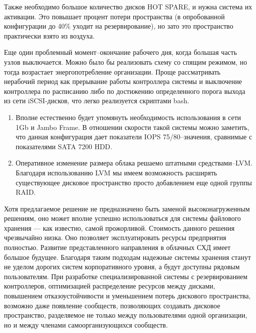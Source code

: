 \documentclass[10pt, a5paper]{article}
\begin{document}
Также необходимо большое количество дисков HOT SPARE, и нужна система их активации. Это повышает процент потери пространства (в опробованной конфигурации до 40\% уходит на резервирование), но зато это пространство практически взято из воздуха.

Еще один проблемный момент--окончание рабочего дня, когда большая часть узлов выключается. Можно было бы реализовать схему со спящим режимом, но тогда возрастает энергопотребление организации. Проще рассматривать нерабочий период как прерывание работы контроллера системы и выключение контроллера по расписанию либо по достижению определенного порога выхода из сети iSCSI-дисков, что легко реализуется скриптами bash.

\begin{enumerate}
  \item Вполне естественно будет упомянуть необходимость использования в сети 1Gb и Jambo Frame.
    В отношении скорости такой системы можно заметить, что данная конфигурация дает показатели IOPS 75/80--значения, сравнимые с показателями SATA 7200 HDD.
  \item Оперативное изменение размера облака решаемо штатными средствами--LVM. Благодаря использованию LVM мы имеем возможность расширять существующее дисковое пространство просто добавлением еще одной группы RAID.
\end{enumerate}

Хотя предлагаемое решение не предназначено быть заменой высоконагруженным решениям, оно может вполне успешно использоваться для системы файлового хранения --- как известно, самой прожорливой.
 Стоимость данного решения чрезвычайно низка. Оно позволяет эксплуатировать ресурсы предприятия полностью.
 Развитие представленного направления в облачных СХД имеет большое будущее. Благодаря таким подходам надежные системы хранения станут не уделом дорогих систем корпоративного уровня, а будут доступны рядовым пользователям. При разработке специализированной системы с резервированием контроллеров, оптимизацией распределение ресурсов между дисками, повышением отказоустойчивости и уменьшением потерь дискового пространства, возможно даже появление сообществ, позволяющих создавать дисковое пространство, разделяемое не только между пользователями одной организации, но и между членами самоорганизующихся сообществ.
\end{document}
